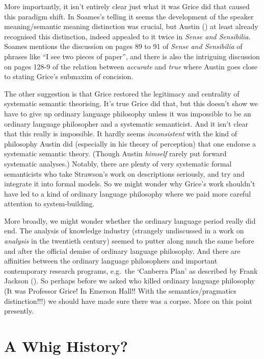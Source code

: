 \documentclass[
  10pt,
  letterpaper,
  DIV=11,
  numbers=noendperiod,
  twoside]{scrartcl}
\begin{document}
More importantly, it isn't entirely clear just what it was Grice did
that caused this paradigm shift. In Soames's telling it seems the
development of the speaker meaning/semantic meaning distinction was
crucial, but Austin () at least already
recognised this distinction, indeed appealed to it twice in \emph{Sense
and Sensibilia}. Soames mentions the discussion on pages 89 to 91 of
\emph{Sense and Sensibilia} of phrases like ``I see two pieces of
paper'', and there is also the intriguing discussion on pages 128-9 of
the relation between \emph{accurate} and \emph{true} where Austin goes
close to stating Grice's submaxim of concision.

The other suggestion is that Grice restored the legitimacy and
centrality of systematic semantic theorising. It's true Grice did that,
but this doesn't show we have to give up ordinary language philosophy
unless it was impossible to be an ordinary language philosopher and a
systematic semanticist. And it isn't clear that this really is
impossible. It hardly seems \emph{inconsistent} with the kind of
philosophy Austin did (especially in his theory of perception) that one
endorse a systematic semantic theory. (Though Austin \emph{himself}
rarely put forward systematic analyses.) Notably, there are plenty of
very systematic formal semanticists who take Strawson's work on
descriptions seriously, and try and integrate it into formal models. So
we might wonder why Grice's work shouldn't have led to a kind of
ordinary language philosophy where we paid more careful attention to
system-building.

More broadly, we might wonder whether the ordinary language period
really did end. The analysis of knowledge industry (strangely
undiscussed in a work on \emph{analysis} in the twentieth century)
seemed to putter along much the same before and after the official
demise of ordinary language philosophy. And there are affinities between
the ordinary language philosophers and important contemporary research
programs, e.g.~the `Canberra Plan' as described by Frank Jackson
(). So perhaps before we asked who
killed ordinary language philosophy (It was Professor Grice! In Emerson
Hall!! With the semantics/pragmatics distinction!!!) we should have made
sure there was a corpse. More on this point presently.

\section{A Whig History?}\label{a-whig-history}
\end{document}
